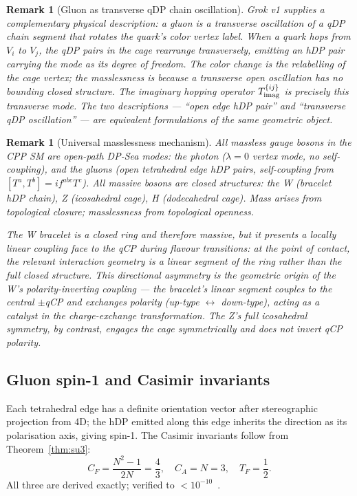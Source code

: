 \documentclass[11pt,letterpaper]{article}
\newtheorem{remark}[theorem]{Remark}
\begin{document}
\begin{remark}[Gluon as transverse qDP chain oscillation]
\label{rem:gluon_transverse}
Grok v1 supplies a complementary physical description: a gluon is
a \emph{transverse oscillation of a qDP chain segment that rotates
the quark's color vertex label}.  When a quark hops from $V_i$ to
$V_j$, the qDP pairs in the cage rearrange transversely, emitting
an hDP pair carrying the mode as its degree of freedom.  The color
change is the relabelling of the cage vertex; the masslessness is
because a transverse open oscillation has no bounding closed
structure.  The imaginary hopping operator $T^{\{ij\}}_{\rm imag}$
is precisely this transverse mode.  The two descriptions --- ``open
edge hDP pair'' and ``transverse qDP oscillation'' --- are
equivalent formulations of the same geometric object.
\end{remark}

\begin{remark}[Universal masslessness mechanism]
All massless gauge bosons in the CPP SM are open-path DP-Sea modes:
the photon ($\lambda=0$ vertex mode, no self-coupling), and the
gluons (open tetrahedral edge hDP pairs, self-coupling from
$[T^a,T^b]=if^{abc}T^c$).  All massive bosons are closed structures:
the W (bracelet hDP chain), Z (icosahedral cage), H (dodecahedral
cage).  Mass arises from topological closure; masslessness from
topological openness.

The W bracelet is a closed ring and therefore massive, but it
presents a \emph{locally linear coupling face} to the qCP during
flavour transitions: at the point of contact, the relevant
interaction geometry is a linear segment of the ring rather than
the full closed structure.  This directional asymmetry is the
geometric origin of the W's polarity-inverting coupling ---
the bracelet's linear segment couples to the central $\pm$qCP and
exchanges polarity (up-type $\leftrightarrow$ down-type),
acting as a catalyst in the charge-exchange transformation.
The Z's full icosahedral symmetry, by contrast, engages the cage
symmetrically and does not invert qCP polarity.
\end{remark}

\subsection{Gluon spin-1 and Casimir invariants}

Each tetrahedral edge has a definite orientation vector after
stereographic projection from 4D; the hDP emitted along this edge
inherits the direction as its polarisation axis, giving spin-1.
The Casimir invariants follow from Theorem~\ref{thm:su3}:
\begin{equation}
C_F = \frac{N^2-1}{2N} = \frac{4}{3},\quad
C_A = N = 3,\quad
T_F = \frac{1}{2}.
\label{eq:casimirs}
\end{equation}
All three are derived exactly; verified to $<10^{-10}$~\citep{cpp_ss_mc}.
\end{document}
